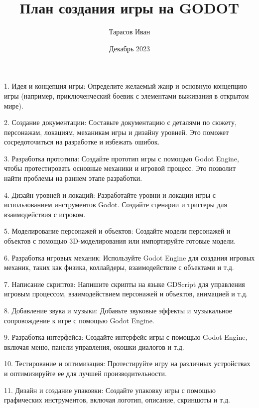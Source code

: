 \documentclass{article}
\title{План создания игры на GODOT}
\author{Тарасов Иван}
\date{Декабрь 2023}
\begin{document}
\maketitle

1. Идея и концепция игры: Определите желаемый жанр и основную концепцию игры (например, приключенческий боевик с элементами выживания в открытом мире).

2. Создание документации: Составьте документацию с деталями по сюжету, персонажам, локациям, механикам игры и дизайну уровней. Это поможет сосредоточиться на разработке и избежать ошибок.

3. Разработка прототипа: Создайте прототип игры с помощью Godot Engine, чтобы протестировать основные механики и игровой процесс. Это позволит найти проблемы на раннем этапе разработки.

4. Дизайн уровней и локаций: Разработайте уровни и локации игры с использованием инструментов Godot. Создайте сценарии и триггеры для взаимодействия с игроком.

5. Моделирование персонажей и объектов: Создайте модели персонажей и объектов с помощью 3D-моделирования или импортируйте готовые модели.

6. Разработка игровых механик: Используйте Godot Engine для создания игровых механик, таких как физика, коллайдеры, взаимодействие с объектами и т.д.

7. Написание скриптов: Напишите скрипты на языке GDScript для управления игровым процессом, взаимодействием персонажей и объектов, анимацией и т.д.

8. Добавление звука и музыки: Добавьте звуковые эффекты и музыкальное сопровождение к игре с помощью Godot Engine.

9. Разработка интерфейса: Создайте интерфейс игры с помощью Godot Engine, включая меню, панели управления, окошки диалогов и т.д.

10. Тестирование и оптимизация: Протестируйте игру на различных устройствах и оптимизируйте ее для лучшей производительности.

11. Дизайн и создание упаковки: Создайте упаковку игры с помощью графических инструментов, включая логотип, описание, скриншоты и т.д.
\end{document}
